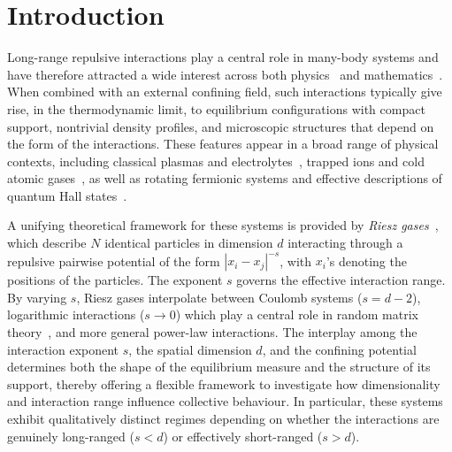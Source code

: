 \documentclass[10pt]{amsart}
\theoremstyle{plain}
\theoremstyle{remark}
\numberwithin{equation}{section}
\begin{document}

\maketitle

\section{Introduction}


Long-range repulsive interactions play a central role in many-body systems and have therefore attracted a wide interest across both physics~\cite{CDFR14} and mathematics~\cite{ST97,Lew22,Se24,BF25a}. 
When combined with an external confining field, such interactions typically give rise, in the thermodynamic limit, to equilibrium configurations with compact support, nontrivial density profiles, and microscopic structures that depend on the form of the interactions. These features appear in a broad range of physical contexts, including classical plasmas and electrolytes~\cite{Bax63,AM1980,CKMN81,JLM93}, trapped ions and cold atomic gases~\cite{BC03}, as well as rotating fermionic systems and effective descriptions of quantum Hall states~\cite{CE2020,Coo10,OLMSE24,LMS19,SDMS22}.

A unifying theoretical framework for these systems is provided by \emph{Riesz gases}~\cite{Riesz38}, which describe $N$ identical particles in dimension $d$ interacting through a repulsive pairwise potential of the form $|x_i-x_j|^{-s}$, with $x_i$'s denoting the positions of the particles. The exponent $s$ governs the effective interaction range. 
By varying $s$, Riesz gases interpolate between Coulomb systems ($s=d-2$), logarithmic interactions ($s\to 0$) which play a central role in random matrix theory~\cite{Meh04,Fo10,BF25}, and more general power-law interactions. The interplay among the interaction exponent $s$, the spatial dimension $d$, and the confining potential determines both the shape of the equilibrium measure and the structure of its support, thereby offering a flexible framework to investigate how dimensionality and interaction range influence collective behaviour. In particular, these systems exhibit qualitatively distinct regimes depending on whether the interactions are genuinely long-ranged ($s<d$) or effectively short-ranged ($s>d$).
\end{document}
